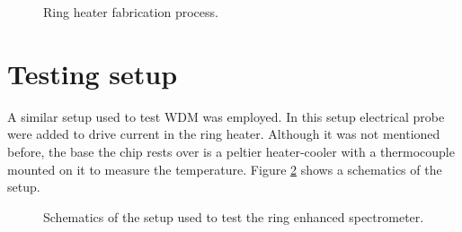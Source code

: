 \documentclass[12pt,twoside,english]{book}
\renewcommand{\~}{\perispomeni}%
\numberwithin{equation}{section}
\numberwithin{figure}{section}
\begin{document}
%
\begin{figure}[h]

\caption{Ring heater fabrication process.}
\label{fig:fabrication heater}
\end{figure}

\begin{figure}[h]
	\center{}
	\caption{}
\end{figure}


\section{Testing setup}
A similar setup used to test WDM was employed. In this setup electrical probe were added to drive current in the ring heater. Although it was not mentioned before, the base the chip rests over is a peltier heater-cooler with a thermocouple mounted on it to measure the temperature. Figure \ref{fig:setup2} shows a schematics of the setup.
\begin{figure}[h]
\center{}
\caption{Schematics of the setup used to test the ring enhanced spectrometer.}
\label{fig:setup2}
\end{figure}
\end{document}
